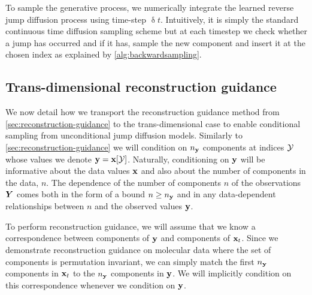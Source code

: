 To sample the generative process, we numerically integrate the learned reverse jump diffusion process using time-step  $\updelta t$. Intuitively, it is simply the standard continuous time diffusion sampling scheme \cite{song2020score} but at each timestep we check whether a jump has occurred and if it has, sample the new component and insert it at the chosen index as explained by \cref{alg:backwardsampling}.

\subsection{Trans-dimensional reconstruction guidance} \label{sec:tddm-reconstruction-guidance}
We now detail how we transport the reconstruction guidance method from \cref{sec:reconstruction-guidance} to the trans-dimensional case to enable conditional sampling from unconditional jump diffusion models. Similarly to \cref{sec:reconstruction-guidance} we will condition on $n_{\mathbf{y}}$ components at indices ${\mathcal{Y}}$ whose values we denote ${\mathbf{y}} = {\mathbf{x}}[{\mathcal{Y}}]$.
Naturally, conditioning on ${\mathbf{y}}$ will be informative about the data values ${\mathbf{x}}$ and also about the number of components in the data, $n$. The dependence of the number of components $n$ of the observations ${\bm{Y}}$ comes both in the form of a bound $n \geq n_{\mathbf{y}}$ and in any data-dependent relationships between $n$ and the observed values ${\mathbf{y}}$.

To perform reconstruction guidance, we will assume that we know a correspondence between components of ${\mathbf{y}}$ and components of ${\mathbf{x}}_t$. Since we demonstrate reconstruction guidance on molecular data where the set of components is permutation invariant, we can simply match the first $n_{\mathbf{y}}$ components in ${\mathbf{x}}_t$ to the $n_{\mathbf{y}}$ components in ${\mathbf{y}}$. We will implicitly condition on this correspondence whenever we condition on ${\mathbf{y}}$.

